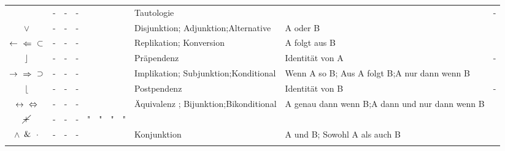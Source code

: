 \documentclass[english,ngerman,parskip=half,headsepline,footsepline]{scrreprt}
\newcommand*{\clq}{'} %
\newcommand*{\crq}{'} %
\newcommand*{\cse}{, } %
\newcommand*{\csp}{\crqt\cset\clqt} %
\newcommand*{\clqt}{} %
\newcommand*{\crqt}{} %
\newcommand*{\cset}{~} %
\newcommand*{\cspt}{\crqt\cset\clqt} %
\begin{document}
\begin{table}
\begin{threeparttable}
\begin{tabularx}{\linewidth-10.95pt}{c||c:cc:cccc|X:X|c|}
				~ &-&-&-&\texttrue&\texttrue&\texttrue&\texttrue& Tautologie&&-\\
				\tableline %
				\clqt$\lor$\crqt &-&-&-&\texttrue&\texttrue&\texttrue&\textfalse& Disjunktion; Adjunktion;\newline Alternative&A oder B&\thepor\\
				\tableline %
				\clqt$\leftarrow$\cspt$\Leftarrow$\cspt$\subset$\crqt &-&-&-&\texttrue&\texttrue&\textfalse&\texttrue& Replikation; Konversion&A folgt aus B&\thepleftimp\\
				\tableline %
				\clqt$\operatorname{\rfloor}$\crqt &-&-&-&\texttrue&\texttrue&\textfalse&\textfalse& Präpendenz&Identität von A&-\\
				\tablegroup %

				\clqt$\rightarrow$\cspt$\Rightarrow$\cspt$\supset$\crqt &-&-&-&\texttrue&\textfalse&\texttrue&\texttrue& Implikation; Subjunktion;\newline Konditional&Wenn A so B; Aus A folgt B;\newline A nur dann wenn B&\theprightimp\\
				\tableline %
				\clqt$\operatorname{\lfloor}$\crqt &-&-&-&\texttrue&\textfalse&\texttrue&\textfalse& Postpendenz&Identität von B&-\\
				\tableline %
				\clqt$\leftrightarrow$\cspt$\Leftrightarrow$\crqt &-&-&-&\texttrue&\textfalse&\textfalse&\texttrue& Äquivalenz ; Bijunktion;\newline Bikonditional&A genau dann wenn B;\newline A dann und nur dann wenn B&\thepequiv\\
				\gapline %
				\clqt$\operatorname{\cancel{+}}$\crqt &-&-&-&"&"&"&"& ~&&\\
				\tableline %
				\clqt$\land$\cspt$\&$\cspt$\cdot$\crqt &-&-&-&\texttrue&\textfalse&\textfalse&\textfalse& Konjunktion&{\small A und B; Sowohl A als auch B}&\thepand\\
				\tablegroup %


\end{tabularx}
\end{threeparttable}
\end{table}
\end{document}
